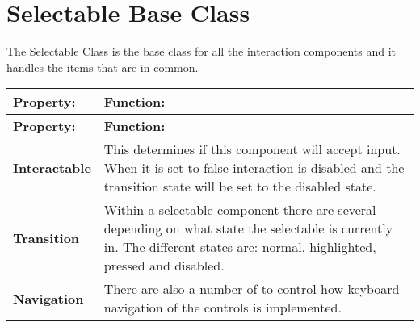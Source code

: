 \chapter{Selectable Base Class}
\hypertarget{md__library_2_package_cache_2com_8unity_8ugui_0d1_80_80_2_documentation_0i_2script-_selectable}{}\label{md__library_2_package_cache_2com_8unity_8ugui_0d1_80_80_2_documentation_0i_2script-_selectable}
\label{md__library_2_package_cache_2com_8unity_8ugui_0d1_80_80_2_documentation_0i_2script-_selectable_autotoc_md1419}%
%
 The Selectable Class is the base class for all the interaction components and it handles the items that are in common.

\tabulinesep=1mm
\begin{longtabu}spread 0pt [c]{*{2}{|X[-1]}|}
\hline
\cellcolor{\tableheadbgcolor}\textbf{ {\bfseries{Property\+:}}   }&\cellcolor{\tableheadbgcolor}\textbf{ {\bfseries{Function\+:}}    }\\
\endfirsthead
\hline
\endfoot
\hline
\cellcolor{\tableheadbgcolor}\textbf{ {\bfseries{Property\+:}}   }&\cellcolor{\tableheadbgcolor}\textbf{ {\bfseries{Function\+:}}    }\\
\endhead
{\bfseries{Interactable}}   &This determines if this component will accept input. When it is set to false interaction is disabled and the transition state will be set to the disabled state.    \\
{\bfseries{Transition}}   &Within a selectable component there are several  depending on what state the selectable is currently in. The different states are\+: normal, highlighted, pressed and disabled.    \\
{\bfseries{Navigation}}   &There are also a number of  to control how keyboard navigation of the controls is implemented.   \\
\end{longtabu}
